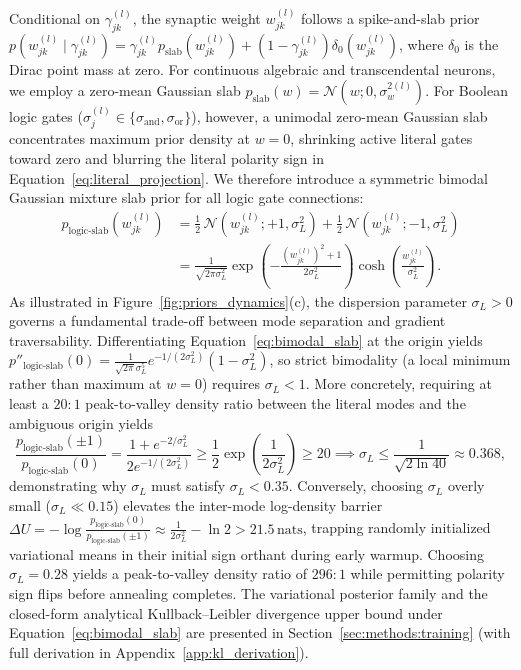 \documentclass[11pt,a4paper]{article}
\begin{document}
Conditional on $\gamma_{jk}^{(l)}$, the synaptic weight $w_{jk}^{(l)}$ follows a spike-and-slab prior $p(w_{jk}^{(l)} \mid \gamma_{jk}^{(l)}) = \gamma_{jk}^{(l)} p_{\text{slab}}(w_{jk}^{(l)}) + (1 - \gamma_{jk}^{(l)})\delta_0(w_{jk}^{(l)})$, where $\delta_0$ is the Dirac point mass at zero. For continuous algebraic and transcendental neurons, we employ a zero-mean Gaussian slab $p_{\text{slab}}(w) = \mathcal{N}(w; 0, \sigma_w^{2(l)})$. For Boolean logic gates ($\sigma_j^{(l)} \in \{\sigma_{\text{and}}, \sigma_{\text{or}}\}$), however, a unimodal zero-mean Gaussian slab concentrates maximum prior density at $w = 0$, shrinking active literal gates toward zero and blurring the literal polarity sign in Equation~\eqref{eq:literal_projection}. We therefore introduce a symmetric bimodal Gaussian mixture slab prior for all logic gate connections:
\begin{equation}
\label{eq:bimodal_slab}
\begin{aligned}
p_{\text{logic-slab}}\!\left(w_{jk}^{(l)}\right) &= \frac{1}{2}\,\mathcal{N}\!\left(w_{jk}^{(l)}; +1, \sigma_L^2\right) + \frac{1}{2}\,\mathcal{N}\!\left(w_{jk}^{(l)}; -1, \sigma_L^2\right) \\
&= \frac{1}{\sqrt{2\pi\sigma_L^2}}\exp\!\left(-\frac{(w_{jk}^{(l)})^2 + 1}{2\sigma_L^2}\right)\cosh\!\left(\frac{w_{jk}^{(l)}}{\sigma_L^2}\right).
\end{aligned}
\end{equation}
As illustrated in Figure~\ref{fig:priors_dynamics}(c), the dispersion parameter $\sigma_L > 0$ governs a fundamental trade-off between mode separation and gradient traversability. Differentiating Equation~\eqref{eq:bimodal_slab} at the origin yields $p''_{\text{logic-slab}}(0) = \frac{1}{\sqrt{2\pi}\sigma_L^5}e^{-1/(2\sigma_L^2)}(1 - \sigma_L^2)$, so strict bimodality (a local minimum rather than maximum at $w = 0$) requires $\sigma_L < 1$. More concretely, requiring at least a $20:1$ peak-to-valley density ratio between the literal modes and the ambiguous origin yields
\begin{equation*}
\frac{p_{\text{logic-slab}}(\pm 1)}{p_{\text{logic-slab}}(0)} = \frac{1 + e^{-2/\sigma_L^2}}{2 e^{-1/(2\sigma_L^2)}} \ge \frac{1}{2}\exp\!\left(\frac{1}{2\sigma_L^2}\right) \ge 20 \implies \sigma_L \le \frac{1}{\sqrt{2\ln 40}} \approx 0.368,
\end{equation*}
demonstrating why $\sigma_L$ must satisfy $\sigma_L < 0.35$. Conversely, choosing $\sigma_L$ overly small ($\sigma_L \ll 0.15$) elevates the inter-mode log-density barrier $\Delta U = -\log\frac{p_{\text{logic-slab}}(0)}{p_{\text{logic-slab}}(\pm 1)} \approx \frac{1}{2\sigma_L^2} - \ln 2 > 21.5\,\text{nats}$, trapping randomly initialized variational means in their initial sign orthant during early warmup. Choosing $\sigma_L = 0.28$ yields a peak-to-valley density ratio of $296:1$ while permitting polarity sign flips before annealing completes. The variational posterior family and the closed-form analytical Kullback--Leibler divergence upper bound under Equation~\eqref{eq:bimodal_slab} are presented in Section~\ref{sec:methods:training} (with full derivation in Appendix~\ref{app:kl_derivation}).
\end{document}
